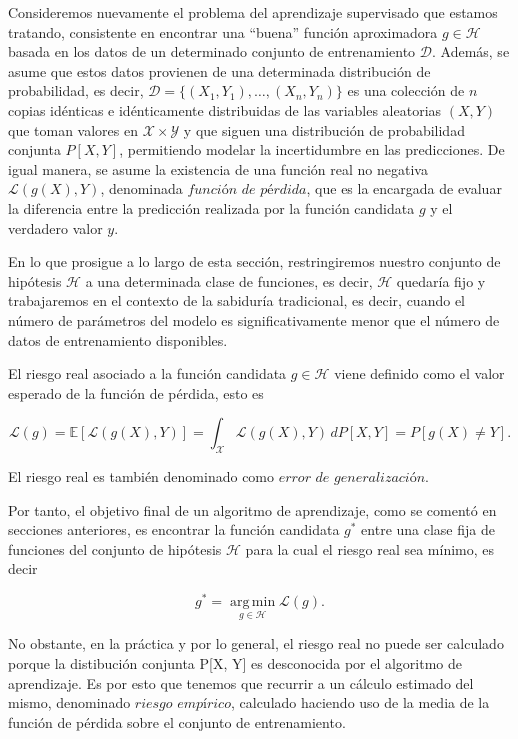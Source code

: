 Consideremos nuevamente el problema del aprendizaje supervisado que estamos tratando, consistente en encontrar una ``buena'' función aproximadora $g \in \mathcal{H}$ basada en los datos de un determinado conjunto de entrenamiento $\mathcal{D}$. Además, se asume que estos datos provienen de una determinada distribución de probabilidad, es decir, $\mathcal{D} = \{(X_{1}, Y_{1}), \ldots, (X_{n}, Y_{n})\}$ es una colección de $n$ copias idénticas e idénticamente distribuidas de las variables aleatorias $(X, Y)$ que toman valores en $\mathcal{X} \times \mathcal{Y}$ y que siguen una distribución de probabilidad conjunta $P[X, Y]$, permitiendo modelar la incertidumbre en las predicciones. De igual manera, se asume la existencia de una función real no negativa $\mathcal{L}(g(X), Y)$, denominada $\textit{función de pérdida}$, que es la encargada de evaluar la diferencia entre la predicción realizada por la función candidata $g$ y el verdadero valor $y$.

En lo que prosigue a lo largo de esta sección, restringiremos nuestro conjunto de hipótesis $\mathcal{H}$ a una determinada clase de funciones, es decir, $\mathcal{H}$ quedaría fijo y trabajaremos en el contexto de la sabiduría tradicional, es decir, cuando el número de parámetros del modelo es significativamente menor que el número de datos de entrenamiento disponibles.

\begin{definicion}\label{def:riesgo-real}
    El riesgo real asociado a la función candidata $g \in \mathcal{H}$ viene definido como el valor esperado de la función de pérdida, esto es

    \[ \mathcal{L}(g) = \mathbb{E}[\mathcal{L}(g(X), Y)] = \int_{\mathcal{X}} \mathcal{L}(g(X), Y) \, dP[X, Y] = P[g(X) \neq Y].\]

    El riesgo real es también denominado como $\textit{error de generalización}$.
\end{definicion}

Por tanto, el objetivo final de un algoritmo de aprendizaje, como se comentó en secciones anteriores, es encontrar la función candidata $g^{*}$ entre una clase fija de funciones del conjunto de hipótesis $\mathcal{H}$ para la cual el riesgo real sea mínimo, es decir

\[ g^{*} = \operatorname*{\arg \,\min}_{g \in \mathcal{H}} \mathcal{L}(g). \]

No obstante, en la práctica y por lo general, el riesgo real no puede ser calculado porque la distibución conjunta P[X, Y] es desconocida por el algoritmo de aprendizaje. Es por esto que tenemos que recurrir a un cálculo estimado del mismo, denominado $\textit{riesgo empírico}$, calculado haciendo uso de la media de la función de pérdida sobre el conjunto de entrenamiento.

